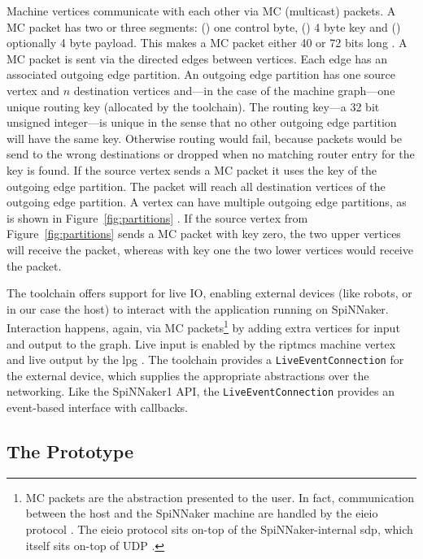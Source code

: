 \documentclass[]{article}
\begin{document}
Machine vertices communicate with each other via MC (multicast)
packets.
A MC packet has two or three segments:
() one control byte, () 4 byte key
and () optionally 4 byte payload.
This makes a MC packet either 40 or 72 bits long
\citep{furber_et_al_2020}.
A MC packet is sent via the directed edges between vertices.
Each edge has an associated outgoing edge partition.
An outgoing edge partition has one source vertex and $n$ destination
vertices and---in the case of the machine graph---one unique
routing key (allocated by the toolchain).
The routing key---a 32 bit unsigned integer---is unique in the sense
that no other outgoing edge partition will have the same key.
Otherwise routing would fail, because packets would be send
to the wrong destinations or dropped when no matching router entry for
the key is found.
If the source vertex sends a MC packet it uses the key of the
outgoing edge partition.
The packet will reach all destination vertices of the outgoing edge
partition.
A vertex can have multiple outgoing edge partitions, as is shown in
Figure~\ref{fig:partitions} \citep{furber_et_al_2020}.
If the source vertex from Figure~\ref{fig:partitions} sends a MC
packet with key zero, the two upper vertices will receive the
packet, whereas with key one the two lower vertices would receive
the packet.

The toolchain offers support for live IO, enabling external devices
(like robots, or in our case the host) to interact with the
application running on SpiNNaker.
Interaction happens, again, via MC packets\footnote{%
  MC packets are the abstraction presented to the user. In fact,
  communication between the host and the SpiNNaker machine are handled
  by the \acrfull{eieio} protocol \citep{rast_et_al_2015}.
  The \acrshort{eieio} protocol sits on-top of the SpiNNaker-internal
  \acrfull{sdp}, which itself sits on-top of UDP
  \citep{furber_et_al_2014}.
}
by adding extra vertices for input and output to the graph.
Live input is enabled by the \acrfull{riptmcs} machine vertex and live
output by the \acrfull{lpg} \citep{furber_et_al_2020}.
The toolchain provides a \texttt{LiveEventCon\-nection} for the
external device, which supplies the appropriate abstractions over the
networking.
Like the SpiNNaker1 API, the \texttt{Live\-Event\-Con\-nection}
provides an event-based interface with callbacks.



\subsection{The Prototype} %
\label{subsec:SpiDNN_arch}
\end{document}
